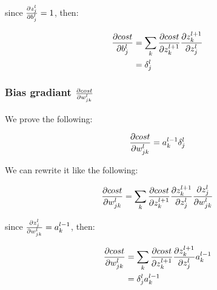 \documentclass[a4paper]{article}
\begin{document}
since $\frac{\partial z_{j}^{l}}{\partial b_{j}^{l}} = 1$, then:

\begin{align}
  \frac{\partial cost}{\partial b_{j}^{l}} &= 
    \sum_{k}{
      \frac{\partial cost}{\partial z_{k}^{l+1}}
      \frac{\partial z_{k}^{l+1}}{\partial z_{j}^{l}}
    } \\
    &= \delta_{j}^{l}
\end{align}

\subsubsection{Bias gradiant $\frac{\partial cost}{\partial w_{jk}^{l}}$}

We prove the following:

\begin{align}
  \frac{\partial cost}{\partial w_{jk}^{l}} = a_{k}^{l-1} \delta_{j}^{l}
\end{align}

We can rewrite it like the following:

\begin{align}
  \frac{\partial cost}{\partial w_{jk}^{l}} = 
    \sum_{k}{
      \frac{\partial cost}{\partial z_{k}^{l+1}}
      \frac{\partial z_{k}^{l+1}}{\partial z_{j}^{l}}
      \frac{\partial z_{j}^{l}}{\partial w_{jk}^{l}}
    }
\end{align}

since $\frac{\partial z_{j}^{l}}{\partial w_{jk}^{l}} = a_{k}^{l-1}$, then:

\begin{align}
  \frac{\partial cost}{\partial w_{jk}^{l}} &= 
    \sum_{k}{
      \frac{\partial cost}{\partial z_{k}^{l+1}}
      \frac{\partial z_{k}^{l+1}}{\partial z_{j}^{l}}
      a_{k}^{l-1}
    } \\
    &= \delta_{j}^{l} a_{k}^{l-1}
\end{align}
\end{document}
